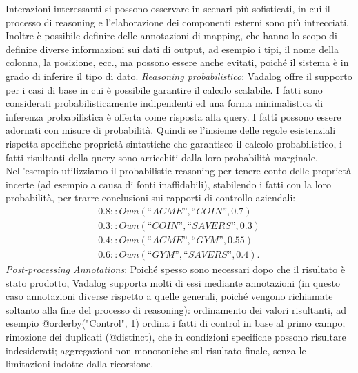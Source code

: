 Interazioni interessanti si possono osservare in scenari più sofisticati, in cui il processo di reasoning e l'elaborazione dei componenti esterni sono più intrecciati. \newline
Inoltre è possibile definire delle annotazioni di mapping, che hanno lo scopo di definire diverse informazioni sui dati di output, ad esempio i tipi, il nome della colonna, la posizione, ecc., ma possono essere anche evitati, poiché il sistema è in grado di inferire il tipo di dato. \newline \newline
\emph{Reasoning probabilistico}: Vadalog offre il supporto per i casi di base in cui è possibile garantire il calcolo scalabile. I fatti sono considerati probabilisticamente indipendenti ed una forma minimalistica di inferenza probabilistica è offerta come risposta alla query. I fatti possono essere adornati con misure di probabilità. \newline
Quindi se l'insieme delle regole esistenziali rispetta specifiche proprietà sintattiche che garantisco il calcolo probabilistico, i fatti risultanti della query sono arricchiti dalla loro probabilità marginale. \newline
Nell'esempio utilizziamo il probabilistic reasoning per tenere conto delle proprietà incerte (ad esempio a causa di fonti inaffidabili), stabilendo i fatti con la loro probabilità, per trarre conclusioni sui rapporti di controllo aziendali:
\begin{align}
	0.8 :: Own(“ACME”, “COIN”, 0.7) \nonumber \\
	0.3 :: Own(“COIN”, “SAVERS”, 0.3) \nonumber \\
	0.4 :: Own(“ACME”, “GYM”, 0.55) \nonumber \\
	0.6 :: Own(“GYM”, “SAVERS”, 0.4). \nonumber 
\end{align}
\emph{Post-processing Annotations}: Poiché spesso sono necessari dopo che il risultato è stato prodotto, Vadalog supporta molti di essi mediante annotazioni (in questo caso annotazioni diverse rispetto a quelle generali, poiché vengono richiamate soltanto alla fine del processo di reasoning): ordinamento dei valori risultanti, ad esempio @orderby("Control", 1) ordina i fatti di control in base al primo campo; rimozione dei duplicati (@distinct), che in condizioni specifiche possono risultare indesiderati; aggregazioni non monotoniche sul risultato finale, senza le limitazioni indotte dalla ricorsione. \newline \newline
